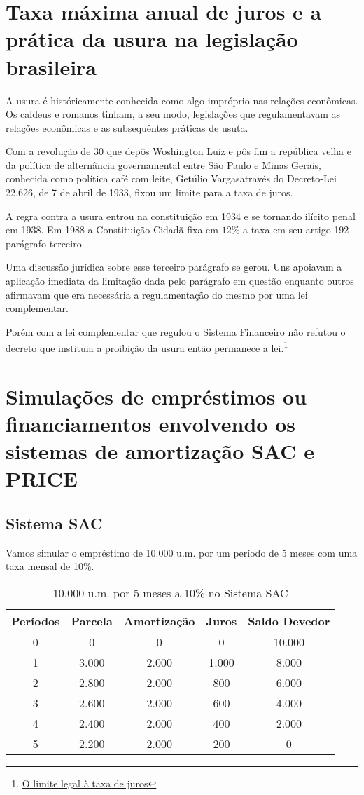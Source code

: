 \section{Taxa máxima anual de juros e a prática da usura na legislação brasileira}

A usura é históricamente conhecida como algo impróprio nas relações econômicas. Os caldeus e romanos tinham, a seu modo, legislações que regulamentavam as relações econômicas e as subsequêntes práticas de usuta.

Com a revolução de 30 que depôs Woshington Luiz e pôs fim a república velha e da política de alternância governamental entre São Paulo e Minas Gerais, conhecida como política café com leite, Getúlio Vargasatravés do Decreto-Lei 22.626, de 7 de abril de 1933, fixou um limite para a taxa de juros.

A regra contra a usura entrou na constituição em 1934 e se tornando ilícito penal em 1938. Em 1988 a Constituição Cidadã fixa em $12\%$ a taxa em seu artigo 192 parágrafo terceiro.

Uma discussão jurídica sobre esse terceiro parágrafo se gerou. Uns apoiavam a aplicação imediata da limitação dada pelo parágrafo em questão enquanto outros afirmavam que era necessária a regulamentação do mesmo por uma lei complementar.

Porém com a lei complementar que regulou o Sistema Financeiro não refutou o decreto que instituia a proibição da usura então permanece a lei.\footnote{\href{http://www.egov.ufsc.br/portal/conteudo/o-limite-legal-\%C3\%A0-taxa-de-juros-0}{O limite legal à taxa de juros}}
\section{Simulações de empréstimos ou financiamentos envolvendo os sistemas de amortização SAC e PRICE}

\subsection{Sistema SAC}

Vamos simular o empréstimo de 10.000 u.m. por um período de 5 meses com uma taxa mensal de 10\%.

\begin{table}[h]
    \centering
    \begin{tabular}{|c|c|c|c|c|}
    \hline
       Períodos  &  Parcela & Amortização & Juros & Saldo Devedor\\
    \hline
       0  & 0 & 0 & 0 & 10.000\\
    \hline
    1     & 3.000 & 2.000 & 1.000 & 8.000\\
    \hline
    2     & 2.800 & 2.000 & 800 & 6.000\\
    \hline
    3     & 2.600 & 2.000 & 600 & 4.000\\
    \hline
    4     & 2.400 & 2.000 & 400 & 2.000\\
    \hline
    5     & 2.200 & 2.000 & 200 & 0\\
    \hline
    \end{tabular}
    \caption{10.000 u.m. por 5 meses a 10\% no Sistema SAC}
    \label{tab:my_label}
\end{table}

